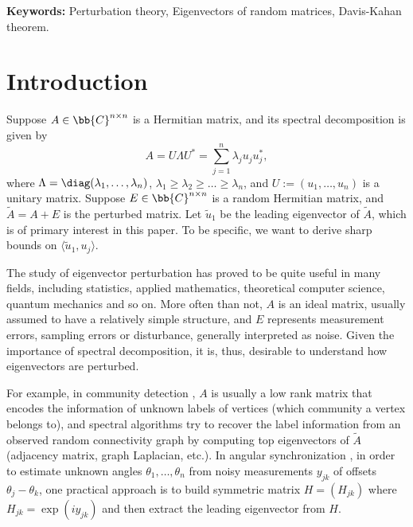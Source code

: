 \documentclass[12pt]{article}%
\theoremstyle{plain}%
\theoremstyle{remark}
\begin{document}
\textbf{Keywords:} Perturbation theory, Eigenvectors of random matrices, Davis-Kahan theorem.

\section{Introduction}\label{sec::intro}
Suppose $A \in \bb{C}^{n \times n}$ is a Hermitian matrix, and its spectral decomposition is given by 
\begin{equation*}
A = U\Lambda U^* = \sum_{j=1}^n \lambda_j u_j u_j^*,
\end{equation*}
where $\Lambda = \diag(\lambda_1,\ldots, \lambda_n)$, $\lambda_1 \ge \lambda_2 \ge \ldots \ge \lambda_n$, and $U := (u_1,\ldots,u_n)$ is a unitary matrix. Suppose $E \in \bb{C}^{n \times n}$ is a random Hermitian matrix, and $\tilde{A} = A + E$ is the perturbed matrix. Let $\tilde{u}_1$ be the leading eigenvector of $\tilde{A}$, which is of primary interest in this paper. To be specific, we want to derive sharp bounds on $\langle \tilde{u}_1, u_j \rangle$.

The study of eigenvector perturbation has proved to be quite useful in many fields, including statistics, applied mathematics, theoretical computer science, quantum mechanics and so on. More often than not, $A$ is an ideal matrix, usually assumed to have a relatively simple structure, and $E$ represents measurement errors, sampling errors or disturbance, generally interpreted as noise. Given the importance of spectral decomposition, it is, thus, desirable to understand how eigenvectors are perturbed. 

For example, in community detection \citep{RohChaYu11}, $A$ is usually a low rank matrix that encodes the information of unknown labels of vertices (which community a vertex belongs to), and spectral algorithms try to recover the label information from an observed random connectivity graph by computing top eigenvectors of $\tilde{A}$ (adjacency matrix, graph Laplacian, etc.). In angular synchronization \citep{Sin11}, in order to estimate unknown angles $\theta_1,\ldots, \theta_n$ from noisy measurements $y_{jk}$ of offsets $\theta_j - \theta_k$, one practical approach is to build symmetric matrix $H = (H_{jk})$ where $H_{jk} = \exp(iy_{jk})$ and then extract the leading eigenvector from $H$.    
\end{document}
